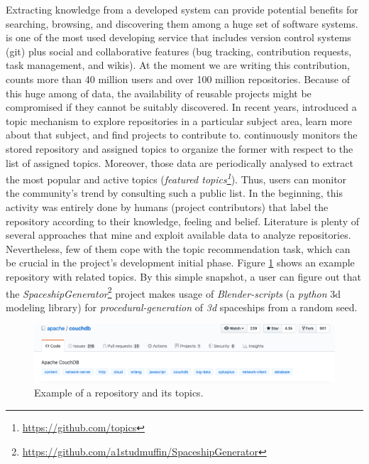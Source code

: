 Extracting knowledge from a developed system can provide potential benefits for searching, browsing, and discovering them among a huge set of software systems.
\GH is one of the most used developing service that includes version control systems (\ie git) plus social and collaborative features (\eg bug tracking, contribution requests, task management, and wikis).
At the moment we are writing this contribution, \GH counts more than 40 million users and over 100 million repositories. Because of this huge among of data, the availability of reusable projects might be compromised if they cannot be suitably discovered. In recent years, \GH introduced a topic mechanism to explore repositories in a particular subject area, learn more about that subject, and find projects to contribute to.
\GH continuously monitors the stored repository and assigned topics to organize the former with respect to the list of assigned topics. Moreover, those data are periodically analysed to extract the most popular and active topics (\ie \emph{featured topics\footnote{\url{https://github.com/topics}}}). Thus, users can monitor the community’s trend by consulting such a public list. In the beginning, this activity was entirely done by humans (\ie project contributors) that label the repository according to their knowledge, feeling and belief. Literature is plenty of several approaches that mine and exploit available data to analyze repositories. Nevertheless, few of them cope with the topic recommendation task, which can be crucial in the project's development initial phase. Figure \ref{fig:SpaceshipGenerator} shows an example repository with related topics. By this simple snapshot, a \GH user can figure out that the \emph{SpaceshipGenerator}\footnote{\label{note:spaceship}\url{https://github.com/a1studmuffin/SpaceshipGenerator}} project makes usage of \emph{Blender-scripts} (\ie a \emph{python} 3d modeling library) for \emph{procedural-generation} of \emph{3d} spaceships from a random seed.



\begin{figure}[h!]
	\centering
	\includegraphics[width=0.8\linewidth]{figs/SpaceshipGenerator.png}
	\caption{Example of a \GH repository and its topics.}
	\label{fig:SpaceshipGenerator}
\end{figure}

